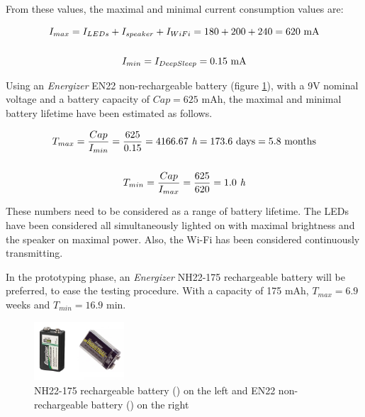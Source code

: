 \medskip From these values, the maximal and minimal current consumption values are:

\begin{gather}
    I_{max} = I_{LEDs} + I_{speaker} + I_{WiFi} = 180 + 200 + 240 = 620 \text{ mA} \\ \notag\\
    I_{min} = I_{DeepSleep} = 0.15 \text{ mA} 
\end{gather}

\medskip Using an \textit{Energizer} EN22 non-rechargeable battery (figure \ref{fig:recharg_battery}), with a 9V nominal voltage and a battery capacity of $Cap = 625$ mAh, the maximal and minimal battery lifetime have been estimated as follows.

\begin{gather}
    T_{max} = \frac{Cap}{I_{min}} = \frac{625}{0.15} = 4166.67 \textit{ h} = 173.6 \text{ days} = 5.8 \text{ months}\\ \notag \\
    T_{min} = \frac{Cap}{I_{max}} = \frac{625}{620} = 1.0 \textit{ h}
\end{gather}

These numbers need to be considered as a range of battery lifetime. The LEDs have been considered all simultaneously lighted on with maximal brightness and the speaker on maximal power. Also, the Wi-Fi has been considered continuously transmitting.

\medskip In the prototyping phase, an \textit{Energizer} NH22-175 rechargeable battery will be preferred, to ease the testing procedure. With a capacity of 175 mAh, $T_{max} = 6.9$ weeks and $T_{min} = 16.9$ min.

\begin{figure}[H]
    \centering
    \includegraphics[width=0.30\textwidth]{images/EE_Battery.JPG}
    \caption{NH22-175 rechargeable battery (\cite{batterydatasheet}) on the left and EN22 non-rechargeable battery (\cite{battery2datasheet}) on the right}
    \label{fig:recharg_battery}
\end{figure}


